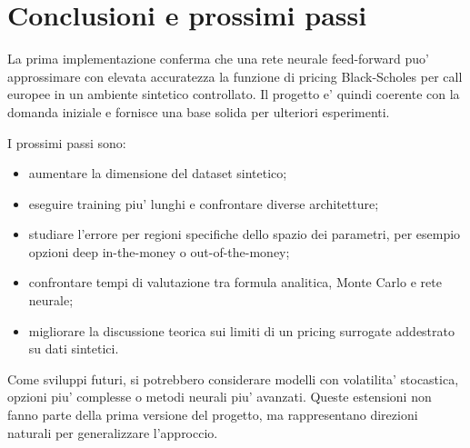 \section{Conclusioni e prossimi passi}

La prima implementazione conferma che una rete neurale feed-forward puo' approssimare con elevata accuratezza la funzione di pricing Black-Scholes per call europee in un ambiente sintetico controllato.
Il progetto e' quindi coerente con la domanda iniziale e fornisce una base solida per ulteriori esperimenti.

I prossimi passi sono:

\begin{itemize}
    \item aumentare la dimensione del dataset sintetico;
    \item eseguire training piu' lunghi e confrontare diverse architetture;
    \item studiare l'errore per regioni specifiche dello spazio dei parametri, per esempio opzioni deep in-the-money o out-of-the-money;
    \item confrontare tempi di valutazione tra formula analitica, Monte Carlo e rete neurale;
    \item migliorare la discussione teorica sui limiti di un pricing surrogate addestrato su dati sintetici.
\end{itemize}

Come sviluppi futuri, si potrebbero considerare modelli con volatilita' stocastica, opzioni piu' complesse o metodi neurali piu' avanzati.
Queste estensioni non fanno parte della prima versione del progetto, ma rappresentano direzioni naturali per generalizzare l'approccio.

